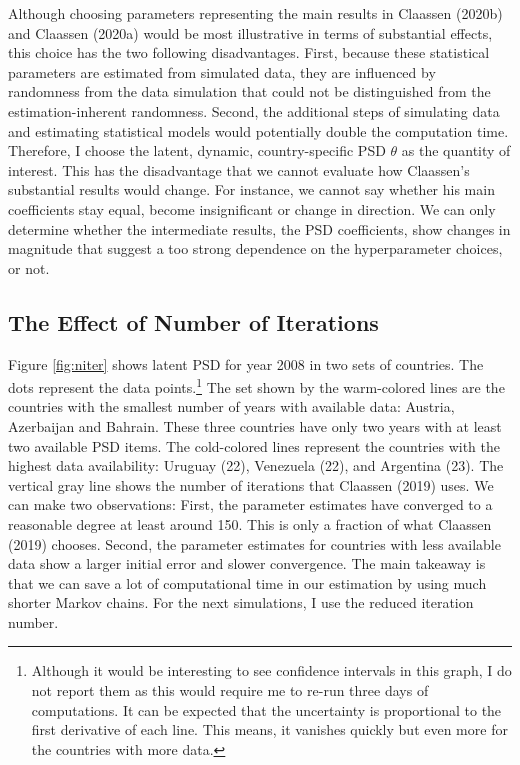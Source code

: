\documentclass[12pt,english,a4paper,oneside]{article}
\theoremstyle{definition}
\theoremstyle{definition}
\theoremstyle{definition}
\theoremstyle{definition}
\theoremstyle{remark}
\begin{document}
Although choosing parameters representing the main results in Claassen (2020b) and Claassen (2020a) would be most illustrative in terms of substantial effects, this choice has the two following disadvantages. First, because these statistical parameters are estimated from simulated data, they are influenced by randomness from the data simulation that could not be distinguished from the estimation-inherent randomness. Second, the additional steps of simulating data and estimating statistical models would potentially double the computation time. Therefore, I choose the latent, dynamic, country-specific PSD \(\theta\) as the quantity of interest. This has the disadvantage that we cannot evaluate how Claassen's substantial results would change. For instance, we cannot say whether his main coefficients stay equal, become insignificant or change in direction. We can only determine whether the intermediate results, the PSD coefficients, show changes in magnitude that suggest a too strong dependence on the hyperparameter choices, or not.

\hypertarget{the-effect-of-number-of-iterations}{%
\subsection{The Effect of Number of Iterations}\label{the-effect-of-number-of-iterations}}

Figure \ref{fig:niter} shows latent PSD for year 2008 in two sets of countries. The dots represent the data points.\footnote{Although it would be interesting to see confidence intervals in this graph, I do not report them as this would require me to re-run three days of computations. It can be expected that the uncertainty is proportional to the first derivative of each line. This means, it vanishes quickly but even more for the countries with more data.} The set shown by the warm-colored lines are the countries with the smallest number of years with available data: Austria, Azerbaijan and Bahrain. These three countries have only two years with at least two available PSD items. The cold-colored lines represent the countries with the highest data availability: Uruguay (22), Venezuela (22), and Argentina (23). The vertical gray line shows the number of iterations that Claassen (2019) uses. We can make two observations: First, the parameter estimates have converged to a reasonable degree at least around 150. This is only a fraction of what Claassen (2019) chooses. Second, the parameter estimates for countries with less available data show a larger initial error and slower convergence. The main takeaway is that we can save a lot of computational time in our estimation by using much shorter Markov chains. For the next simulations, I use the reduced iteration number.
\end{document}
